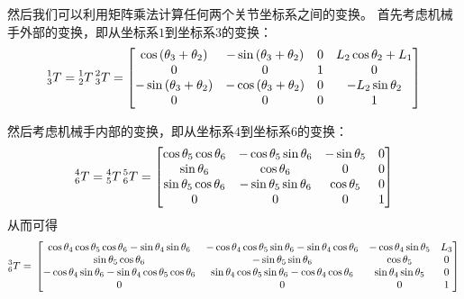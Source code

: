 \documentclass{ctexart}
\begin{document}
然后我们可以利用矩阵乘法计算任何两个关节坐标系之间的变换。
首先考虑机械手外部的变换，即从坐标系$1$到坐标系$3$的变换：
\[
    \prescript{1}{3}{T} = \prescript{1}{2}{T} \prescript{2}{3}{T} =
    \begin{bmatrix}
        \cos{\left( {{\theta }_3}+{{\theta }_2}\right) } & -\sin{\left( {{\theta }_3}+{{\theta }_2}\right) } & 0 & {L_2} \cos{ {{\theta }_2} }+{L_1}\\
        0 & 0 & 1 & 0\\
        -\sin{\left( {{\theta }_3}+{{\theta }_2}\right) } & -\cos{\left( {{\theta }_3}+{{\theta }_2}\right) } & 0 & - {L_2} \sin{ {{\theta }_2} } \\
        0 & 0 & 0 & 1
    \end{bmatrix}
\]

然后考虑机械手内部的变换，即从坐标系$4$到坐标系$6$的变换：
\[
    \prescript{4}{6}{T} = \prescript{4}{5}{T} \prescript{5}{6}{T} =
    \begin{bmatrix}\cos{ {{\theta }_5} } \cos{ {{\theta }_6} } & - \cos{ {{\theta }_5} } \sin{ {{\theta }_6} }  & -\sin{ {{\theta }_5} } & 0\\
        \sin{ {{\theta }_6} } & \cos{ {{\theta }_6} } & 0 & 0\\
        \sin{ {{\theta }_5} } \cos{ {{\theta }_6} } & - \sin{ {{\theta }_5} } \sin{ {{\theta }_6} }  & \cos{ {{\theta }_5} } & 0\\
        0 & 0 & 0 & 1
    \end{bmatrix}
\]
从而可得
\[
        \prescript{3}{6}{T} = \\
    \begin{bmatrix}\cos{{{\theta }_4} } \cos{ {{\theta }_5} } \cos{ {{\theta }_6} }-\sin{ {{\theta }_4} } \sin{ {{\theta }_6} } & - \cos{ {{\theta }_4} } \cos{ {{\theta }_5} } \sin{ {{\theta }_6} } -\sin{ {{\theta }_4} } \cos{ {{\theta }_6} } & - \cos{ {{\theta }_4} } \sin{ {{\theta }_5} }  & {L_3}\\
        \sin{ {{\theta }_5} } \cos{ {{\theta }_6} } & - \sin{ {{\theta }_5} } \sin{ {{\theta }_6} }  & \cos{ {{\theta }_5} } & 0\\
        - \cos{{{\theta }_4}} \sin{ {{\theta }_6} } -\sin{ {{\theta }_4} } \cos{ {{\theta }_5} } \cos{ {{\theta }_6} } & \sin{ {{\theta }_4} } \cos{ {{\theta }_5} } \sin{ {{\theta }_6} }-\cos{ {{\theta }_4} } \cos{ {{\theta }_6} } & \sin{ {{\theta }_4} } \sin{ {{\theta }_5} } & 0\\
        0 & 0 & 0 & 1
    \end{bmatrix}
\]
\end{document}
